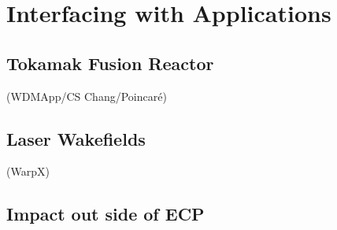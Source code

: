 \section{Interfacing with Applications}

\subsection{Tokamak Fusion Reactor}


(WDMApp/CS Chang/Poincar\'{e})

\subsection{Laser Wakefields}


(WarpX)

\subsection{Impact out side of ECP}


